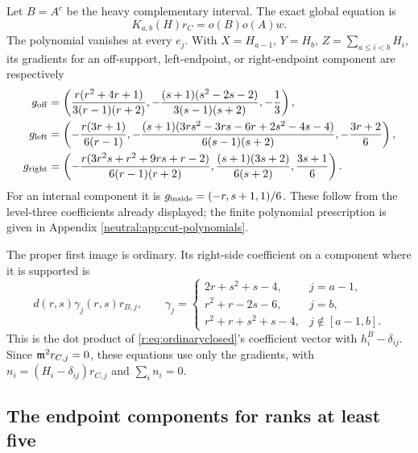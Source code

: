 \documentclass[11pt,a4paper]{article}
\numberwithin{equation}{section}
\theoremstyle{definition}\newtheorem{definition}[theorem]{Definition}
\theoremstyle{remark}\newtheorem{remark}[theorem]{Remark}
\begin{document}
Let \(B=A^c\) be the heavy complementary interval. The exact
global equation is
\[
                    K_{a,b}(H)r_C=o(B)o(A)w.
\]
The polynomial vanishes at every \(e_j\). With
\(X=H_{a-1}\), \(Y=H_b\), \(Z=\sum_{a\le i<b}H_i\),
its gradients for an off-support, left-endpoint, or right-endpoint
component are respectively
\begin{align*}
 g_{\rm off}&=\left(
 \frac{r(r^2+4r+1)}{3(r-1)(r+2)},
 -\frac{(s+1)(s^2-2s-2)}{3(s-1)(s+2)},-\frac13\right),\\
 g_{\rm left}&=\left(
 -\frac{r(3r+1)}{6(r-1)},
 -\frac{(s+1)(3rs^2-3rs-6r+2s^2-4s-4)}{6(s-1)(s+2)},
 -\frac{3r+2}{6}\right),\\
 g_{\rm right}&=\left(
 -\frac{r(3r^2s+r^2+9rs+r-2)}{6(r-1)(r+2)},
 \frac{(s+1)(3s+2)}{6(s+2)},\frac{3s+1}{6}\right).
\end{align*}
For an internal component it is
\(g_{\rm inside}=(-r,s+1,1)/6\).
These follow from the level-three coefficients already displayed;
the finite polynomial prescription is given in
Appendix \ref{neutral:app:cut-polynomials}.

The proper first image is ordinary. Its right-side coefficient
on a component where it is supported is
\[
 d(r,s)\gamma_j(r,s)r_{B,j},\qquad
 \gamma_j=\begin{cases}
 2r+s^2+s-4,&j=a-1,\\
 r^2+r-2s-6,&j=b,\\
 r^2+r+s^2+s-4,&j\notin[a-1,b].
 \end{cases}
\]
This is the dot product of \eqref{r:eq:ordinaryclosed}'s coefficient
vector with \(h_i^B-\delta_{ij}\).
Since \(\mathfrak m^2r_{C,j}=0\), these equations use only the gradients,
with \(n_i=(H_i-\delta_{ij})r_{C,j}\) and \(\sum_i n_i=0\).

\subsection{The endpoint components for ranks at least five}
\end{document}

